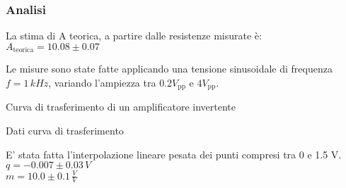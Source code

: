 \subsubsection{Analisi}
La stima di A teorica, a partire dalle resistenze misurate è:\\
$A_\textrm{teorica}=10.08 \pm 0.07$ %

Le misure sono state fatte applicando una tensione sinusoidale di frequenza $ f=1 \,kHz$, variando l'ampiezza tra 
$0.2 V_\textrm{pp}$ e $4 V_\textrm{pp}$.

\begin{grafico} 
 \centering
 \resizebox{\textwidth}{!}{%
 
 }%
 \caption{Curva di trasferimento di un amplificatore invertente} 
 \label{gr:amp_noninv.tex} 
\end{grafico}

\begin{tabella}
 \centering
 
 \caption{Dati curva di trasferimento}
 \label{tab:tab_non_inv.tex}
\end{tabella}

E' stata fatta l'interpolazione lineare pesata dei punti compresi tra 0 e 1.5 V.\\
$q = -0.007 \pm 0.03 \, V$\\
$m = 10.0 \pm 0.1 \,\frac{V}{V}$

